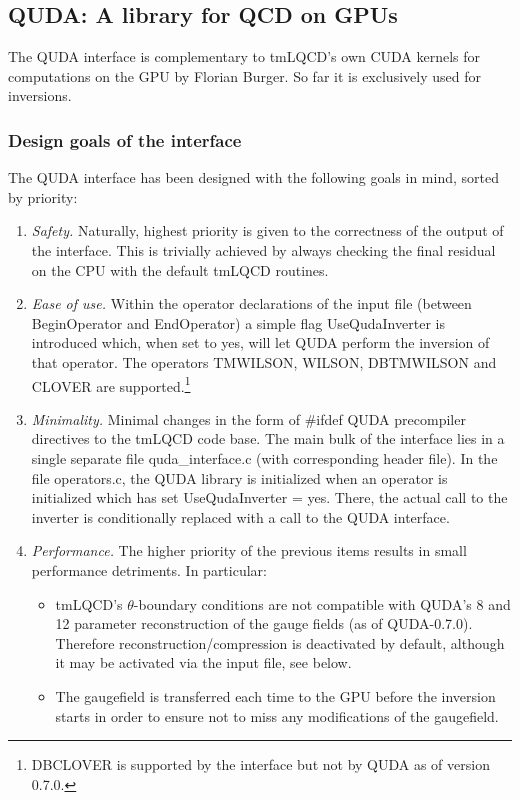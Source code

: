 
\subsection{QUDA: A library for QCD on GPUs}


The QUDA \cite{Clark:2009wm, Babich:2011np, Strelchenko:2013vaa} interface is complementary to tmLQCD's own CUDA kernels for computations on the GPU by Florian Burger.
So far it is exclusively used for inversions.

\subsubsection{Design goals of the interface}
The QUDA interface has been designed with the following goals in mind, sorted by priority:
\begin{enumerate}
	\item \emph{Safety.} Naturally, highest priority is given to the correctness of the output of the interface. 
	This is trivially achieved by always checking the final residual on the CPU with the default tmLQCD routines.
	\item \emph{Ease of use.} Within the operator declarations of the input file (between {\ttfamily BeginOperator} and {\ttfamily EndOperator}) a simple flag {\ttfamily UseQudaInverter} is introduced which, when set to {\ttfamily yes}, will let QUDA perform the inversion of that operator. The operators {\ttfamily TMWILSON, WILSON, DBTMWILSON} and {\ttfamily CLOVER} are supported.\footnote{{\ttfamily DBCLOVER} is supported by the interface but not by QUDA as of version 0.7.0.}
	\item \emph{Minimality.} Minimal changes in the form of {\ttfamily \#ifdef QUDA} precompiler directives to the tmLQCD code base. The main bulk of the interface lies in a single separate file {\ttfamily quda\_interface.c} (with corresponding header file). In the file {\ttfamily operators.c}, the QUDA library is initialized when an operator is initialized which has set {\ttfamily UseQudaInverter = yes}. There, the actual call to the inverter is conditionally replaced with a call to the QUDA interface.
	\item \emph{Performance.} The higher priority of the previous items results in small performance detriments. In particular:
	\begin{itemize}
		\item tmLQCD's $\theta$-boundary conditions are not compatible with QUDA's 8 and 12 parameter reconstruction of the gauge fields (as of QUDA-0.7.0). Therefore reconstruction/compression is deactivated by default, although it may be activated via the input file, see below.
		\item The gaugefield is transferred each time to the GPU before the inversion starts in order to ensure not to miss any modifications of the gaugefield.
	\end{itemize}
\end{enumerate}


